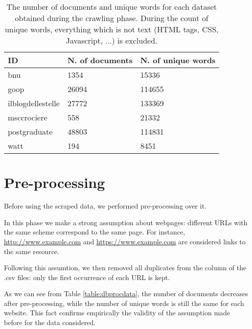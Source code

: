 \begin{table}[H]
    \begin{center}
        \begin{tabular}{ |l|l|l| }
            \hline
            ID                & N. of documents & N. of unique words \\
            \hline
            bnu               & 1354            & 15336              \\
            \hline
            goop              & 26094           & 114655             \\
            \hline
            ilblogdellestelle & 27772           & 133369             \\
            \hline
            msccrociere       & 558             & 21332              \\
            \hline
            postgraduate      & 48803           & 114831             \\
            \hline
            watt              & 194             & 8451               \\
            \hline
        \end{tabular}
    \end{center}
    \caption{
        The number of documents and unique words for each dataset obtained during the crawling phase.
        During the count of unique words, everything which is not text (HTML tags, CSS, Javascript, ...) is excluded.
    }
    \label{table:dbdata}
\end{table}

\section{Pre-processing} \label{preprocessing}
Before using the scraped data, we performed pre-processing over it.

In this phase we make a strong assumption about webpages:
different URLs with the same scheme correspond to the same page.
For instance, \url{http://www.example.com} and \url{https://www.example.com}
are considered links to the same resource.

Following this assumtion, we then removed all duplicates from the  column
of the .csv files: only the first occurrence of each URL is kept.

As we can see from Table \ref{table:dbprocdata}, the number of documents decreases after pre-processing,
while the number of unique words is still the same for each website.
This fact confirms empirically the validity of the assumption made before for the data considered.

